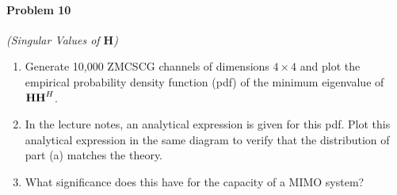 \documentclass[12pt]{article}
\begin{document}



\paragraph{Problem 10} {\it (Singular Values of $\mathbf H$) } 
\begin{enumerate}
\item Generate 10,000 ZMCSCG channels of dimensions $4 \times 4 $ and plot the empirical probability density function (pdf) of the minimum eigenvalue of ${\bf H H}^H$.
\item In the lecture notes, an analytical expression is given for this pdf. Plot this analytical expression in the same diagram to verify that the distribution of part (a) matches the theory. 
\item What significance does this have for the capacity of a MIMO system?
\end{enumerate}
\end{document}
